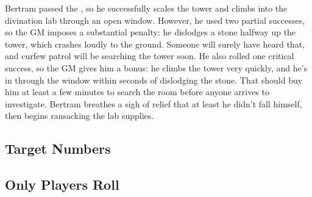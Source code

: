 Bertram passed the {\test}, so he successfully scales the tower and climbs into the divination lab through an open window.
However, he used two partial successes, so the GM imposes a substantial penalty: he dislodges a stone halfway up the tower, which crashes loudly to the ground.
Someone will surely have heard that, and curfew patrol will be searching the tower soon.
He also rolled one critical success, so the GM gives him a bonus: he climbs the tower very quickly, and he's in through the window within seconds of dislodging the stone.
That should buy him at least a few minutes to search the room before anyone arrives to investigate.
Bertram breathes a sigh of relief that at least he didn't fall himself, then begins ransacking the lab supplies.

\subsection{Target Numbers}


\subsection{Only Players Roll}

